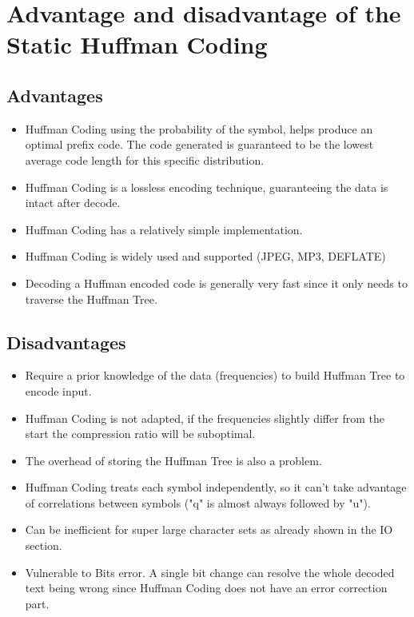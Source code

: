 \section{Advantage and disadvantage of the Static Huffman Coding}
\subsection{Advantages}
\begin{itemize}
    \item Huffman Coding using the probability of the symbol, helps produce an optimal prefix code. The code generated is guaranteed to be the lowest average code length for this specific distribution.
    \item Huffman Coding is a lossless encoding technique, guaranteeing the data is intact after decode.
    \item Huffman Coding has a relatively simple implementation.
    \item Huffman Coding is widely used and supported (JPEG, MP3, DEFLATE)
    \item Decoding a Huffman encoded code is generally very fast since it only needs to traverse the Huffman Tree.
\end{itemize}
\subsection{Disadvantages}
\begin{itemize}
    \item Require a prior knowledge of the data (frequencies) to build Huffman Tree to encode input.
    \item Huffman Coding is not adapted, if the frequencies slightly differ from the start the compression ratio will be suboptimal.
    \item The overhead of storing the Huffman Tree is also a problem.
    \item Huffman Coding treats each symbol independently, so it can’t take advantage of correlations between symbols ("q" is almost always followed by "u").
    \item Can be inefficient for super large character sets as already shown in the IO section.
    \item Vulnerable to Bits error. A single bit change can resolve the whole decoded text being wrong since Huffman Coding does not have an error correction part.
\end{itemize}